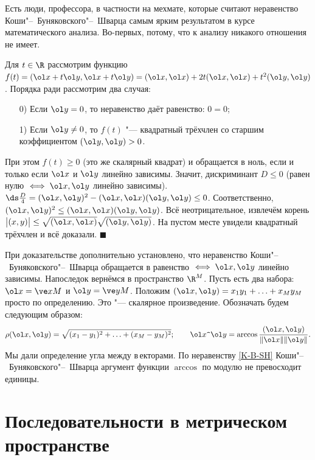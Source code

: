 \documentclass[a4paper,10pt,twoside]{article}
\newenvironment{Zam}
     	{\par\noindent{\textbf{Замечание.}}}{}
\newenvironment{Proof}
       {\par\noindent{\textbf{Доказательство.}}}
       {\hfill$\scriptstyle\blacksquare$}
\let\AVsection\section{}
\renewcommand\section{\newpage\scol\AVsection}
\newcommand{\scol}{  \renewcommand{\headrulewidth}{0.5pt}\fancyhead[RE,LO]{\thesection{} \leftmark} \fancyhead[LE,RO]{\thepage}}
\begin{document}
	 Есть люди, профессора, в частности на мехмате, которые считают неравенство Коши"--~Буняковского"--~Шварца самым ярким результатом в курсе математического
	 анализа. Во-первых, потому, что к анализу никакого отношения не имеет.
	 \begin{Proof}
	 Для $t\in\R$ рассмотрим функцию $f(t) = (\ol x + t \ol y, \ol x + t \ol y) = (\ol x, \ol x) + 2t(\ol x,\ol x) + t^2(\ol y, \ol y)$.
	 Порядка ради рассмотрим два случая:
	 \begin{itemize}
	   \item [0)] Если $\ol y = 0$, то неравенство даёт равенство: $0 = 0$;
	   \item [1)] Если $\ol y\neq 0$, то $f(t)$ "--- квадратный трёхчлен со старшим коэффициентом $(\ol y,\ol y) > 0$.
	 \end{itemize}
	 При этом $f(t)\geq 0$ (это же скалярный квадрат) и обращается в ноль, если и только если $\ol x$ и $\ol y$ линейно зависимы.
	 Значит, дискриминант $D\leq 0$ (равен нулю $\iff \ol x,\ol y$ линейно зависимы). 
	 $\ds\frac{D}4 = (\ol x,\ol y)^2 - (\ol x,\ol x)(\ol y,\ol y)\leq 0$. Соответственно, $(\ol x,\ol y)^2\leq (\ol x,\ol x)(\ol y,\ol y)$.
	 Всё неотрицательное, извлечём корень $\big|(x,y)\big|\leq \sqrt{(\ol x,\ol x)}\sqrt{(\ol y,\ol y)}$.
	 На пустом месте увидели квадратный трёхчлен и всё доказали.
	 \end{Proof}
	 \begin{Zam}
	 При доказательстве дополнительно установлено, что неравенство Коши"--~Буняковского"--~Шварца обращается в равенство $\iff \ol x,\ol y$ 
	 линейно зависимы.
	 \end{Zam}
	 Напоследок вернёмся в пространство $\R^M$. Пусть есть два набора: $\ol x = \ve xM$ и $\ol y= \ve yM$.
	 Положим $(\ol x,\ol y) = x_1y_1+\ldots+x_My_M$ просто по определению. Это "--- скалярное произведение. Обозначать будем следующим образом:
	 \[\rho(\ol x,\ol y) = \sqrt{(x_1 - y_1)^2 + \ldots +(x_M - y_M)^2};\qquad \ol x \verb|^|\ol y = \arccos \frac{(\ol x,\ol y)}{\|\ol x\|\|\ol y\|}.\]
	 Мы дали определение угла между в\,{е}кторами. По неравенству \ref{K-B-SH} Коши"--~Буняковского"--~Шварца аргумент функции $\arccos$ по модулю не превосходит единицы.
	 
	 \section{Последовательности в метрическом пространстве}
\end{document}
